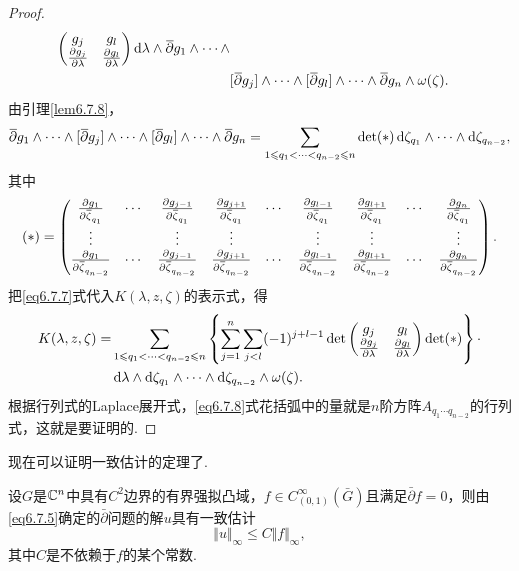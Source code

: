\begin{proof}
\begin{align*}
\begin{pmatrix}
			g_j & g_l\\
			\frac{\partial g_j}{\partial \lambda} & \frac{\partial g_l}{\partial \lambda}
		\end{pmatrix}\mathop{}\!\mathrm{d}\lambda\wedge{}\mkern1mu\overline{\mkern-1mu\partial}g_1\wedge\cdots\wedge\\
		&[{}\mkern1mu\overline{\mkern-1mu\partial}g_j]\wedge\cdots\wedge[{}\mkern1mu\overline{\mkern-1mu\partial}g_l]\wedge\cdots\wedge{}\mkern1mu\overline{\mkern-1mu\partial}g_n\wedge\omega(\zeta).
	\end{align*}
	由引理\ref{lem6.7.8}，
	\begin{equation}\label{eq6.7.7}
		{}\mkern1mu\overline{\mkern-1mu\partial}g_1\wedge\cdots\wedge
		[{}\mkern1mu\overline{\mkern-1mu\partial}g_j]\wedge\cdots\wedge[{}\mkern1mu\overline{\mkern-1mu\partial}g_l]\wedge\cdots\wedge{}\mkern1mu\overline{\mkern-1mu\partial}g_n=\sum_{1\leqslant q_1<\cdots<q_{n-2}\leqslant n}\det(\ast)\mathop{}\!\mathrm{d}\zeta_{q_1}\wedge\cdots\wedge\mathop{}\!\mathrm{d}\zeta_{q_{n-2}},
	\end{equation}
	其中
	\[(\ast)=\begin{pmatrix}
		\frac{\partial g_1}{\partial {}\mkern1mu\overline{\mkern-1mu\zeta}_{q_1}} & \cdots &\frac{\partial g_{j-1}}{\partial {}\mkern1mu\overline{\mkern-1mu\zeta}_{q_1}} & \frac{\partial g_{j+1}}{\partial {}\mkern1mu\overline{\mkern-1mu\zeta}_{q_1}} & \cdots & \frac{\partial g_{l-1}}{\partial {}\mkern1mu\overline{\mkern-1mu\zeta}_{q_1}} & \frac{\partial g_{l+1}}{\partial {}\mkern1mu\overline{\mkern-1mu\zeta}_{q_1}} & \cdots &\frac{\partial g_n}{\partial {}\mkern1mu\overline{\mkern-1mu\zeta}_{q_1}}\\
		\vdots & & \vdots &\vdots & & \vdots & \vdots & & \vdots\\
		\frac{\partial g_1}{\partial {}\mkern1mu\overline{\mkern-1mu\zeta}_{q_{n-2}}} & \cdots &\frac{\partial g_{j-1}}{\partial {}\mkern1mu\overline{\mkern-1mu\zeta}_{q_{n-2}}} & \frac{\partial g_{j+1}}{\partial {}\mkern1mu\overline{\mkern-1mu\zeta}_{q_{n-2}}} & \cdots & \frac{\partial g_{l-1}}{\partial {}\mkern1mu\overline{\mkern-1mu\zeta}_{q_{n-2}}} & \frac{\partial g_{l+1}}{\partial {}\mkern1mu\overline{\mkern-1mu\zeta}_{q_{n-2}}} & \cdots &\frac{\partial g_n}{\partial {}\mkern1mu\overline{\mkern-1mu\zeta}_{q_{n-2}}}
	\end{pmatrix}.\]
	把\eqref{eq6.7.7}式代入$K(\lambda,z,\zeta)$的表示式，得
	\begin{align}\label{eq6.7.8}
K(\lambda,z,\zeta)=
&\sum_{1\leqslant q_1<\cdots<q_{n-2}\leqslant n}\left\{\sum_{j=1}^{n}\sum_{j<l}(-1)^{j+l-1}\det\begin{pmatrix}
	g_j & g_l\\
	\frac{\partial g_j}{\partial \lambda} & \frac{\partial g_l}{\partial \lambda}
\end{pmatrix}\det(\ast)\right\}\cdot\notag\\
&\mathop{}\!\mathrm{d}\lambda\wedge\mathop{}\!\mathrm{d}\zeta_{q_1}\wedge\cdots\wedge\mathop{}\!\mathrm{d}\zeta_{q_{n-2}}\wedge\omega(\zeta).		
	\end{align}
	根据行列式的Laplace展开式，\eqref{eq6.7.8}式花括弧中的量就是$n$阶方阵$A_{q_1\cdots q_{n-2}}$的行列式，这就是要证明的.
		\end{proof}
现在可以证明一致估计的定理了.
\begin{theorem}\label{thm6.7.10}
	设$G$是$\mathbb C^n$中具有$C^2$边界的有界强拟凸域，$f\in C_{(0,1)}^\infty(\bar{G})$且满足$\bar{\partial}f=0$，则由\eqref{eq6.7.5}确定的$\bar{\partial}$问题的解$u$具有一致估计
	\[\Vert u\Vert_\infty\le C\Vert f\Vert_\infty,\]
	其中$C$是不依赖于$f$的某个常数.
\end{theorem}
